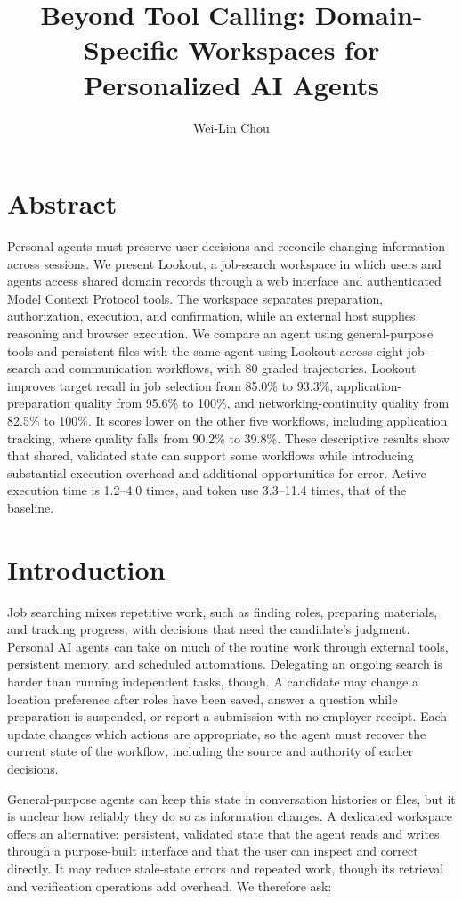 \documentclass[twocolumn]{article}
\title{Beyond Tool Calling: Domain-Specific Workspaces
for Personalized AI Agents}
\author{Wei-Lin Chou}
\date{}
\begin{document}
\maketitle

\section*{Abstract}
Personal agents must preserve user decisions and reconcile changing information across sessions. We present Lookout, a job-search workspace in which users and agents access shared domain records through a web interface and authenticated Model Context Protocol tools. The workspace separates preparation, authorization, execution, and confirmation, while an external host supplies reasoning and browser execution. We compare an agent using general-purpose tools and persistent files with the same agent using Lookout across eight job-search and communication workflows, with 80 graded trajectories. Lookout improves target recall in job selection from 85.0\% to 93.3\%, application-preparation quality from 95.6\% to 100\%, and networking-continuity quality from 82.5\% to 100\%. It scores lower on the other five workflows, including application tracking, where quality falls from 90.2\% to 39.8\%. These descriptive results show that shared, validated state can support some workflows while introducing substantial execution overhead and additional opportunities for error. Active execution time is 1.2--4.0 times, and token use 3.3--11.4 times, that of the baseline.

\section{Introduction}

Job searching mixes repetitive work, such as finding roles, preparing materials, and tracking progress, with decisions that need the candidate's judgment. Personal AI agents can take on much of the routine work through external tools, persistent memory, and scheduled automations. Delegating an ongoing search is harder than running independent tasks, though. A candidate may change a location preference after roles have been saved, answer a question while preparation is suspended, or report a submission with no employer receipt. Each update changes which actions are appropriate, so the agent must recover the current state of the workflow, including the source and authority of earlier decisions.

General-purpose agents can keep this state in conversation histories or files, but it is unclear how reliably they do so as information changes. A dedicated workspace offers an alternative: persistent, validated state that the agent reads and writes through a purpose-built interface and that the user can inspect and correct directly. It may reduce stale-state errors and repeated work, though its retrieval and verification operations add overhead. We therefore ask:
\end{document}
